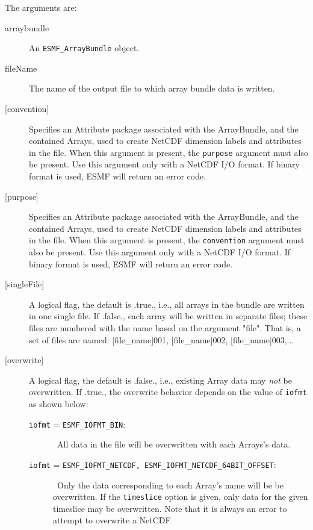      The arguments are:
     \begin{description}
     \item[arraybundle] 
       An {\tt ESMF\_ArrayBundle} object.
     \item[fileName]
       The name of the output file to which array bundle data is written.
     \item[{[convention]}]
       Specifies an Attribute package associated with the ArrayBundle, and the
       contained Arrays, used to create NetCDF dimension labels and attributes
       in the file.  When this argument is present, the {\tt purpose} 
       argument must also be present.  Use this argument only with a NetCDF
       I/O format. If binary format is used, ESMF will return an error code.
     \item[{[purpose]}]
       Specifies an Attribute package associated with the ArrayBundle, and the
       contained Arrays, used to create NetCDF dimension labels and attributes
       in the file.  When this argument is present, the {\tt convention} 
       argument must also be present.  Use this argument only with a NetCDF
       I/O format. If binary format is used, ESMF will return an error code.
     \item[{[singleFile]}]
       A logical flag, the default is .true., i.e., all arrays in the bundle 
       are written in one single file. If .false., each array will be written
       in separate files; these files are numbered with the name based on the
       argument "file". That is, a set of files are named: [file\_name]001,
       [file\_name]002, [file\_name]003,...
     \item[{[overwrite]}]
      \begin{sloppypar}
        A logical flag, the default is .false., i.e., existing Array data may
        {\em not} be overwritten. If .true., the overwrite behavior depends
        on the value of {\tt iofmt} as shown below:
      \begin{description}
      \item[{\tt iofmt} = {\tt ESMF\_IOFMT\_BIN}:]\ All data in the file will
        be overwritten with each Arrays's data.
      \item[{\tt iofmt} = {\tt ESMF\_IOFMT\_NETCDF, ESMF\_IOFMT\_NETCDF\_64BIT\_OFFSET}:]\ Only the
        data corresponding to each Array's name will be
        be overwritten. If the {\tt timeslice} option is given, only data for
        the given timeslice may be overwritten.
        Note that it is always an error to attempt to overwrite a NetCDF

\end{description}
\end{sloppypar}
\end{description}
